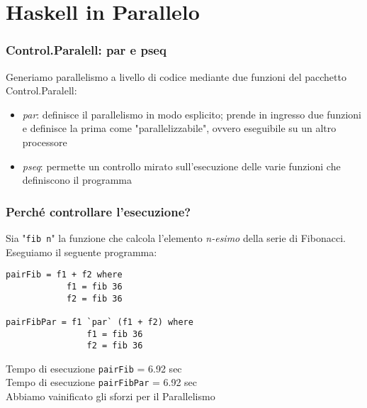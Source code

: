 \documentclass[14pt]{beamer}
\begin{document}

\section{Haskell in Parallelo}




\begin{frame}
\frametitle{Control.Paralell: par e pseq}
Generiamo parallelismo a livello di codice mediante due funzioni del pacchetto Control.Paralell:
\begin{itemize}
\item \textit{par}: definisce il parallelismo in modo esplicito; prende in ingresso due funzioni e definisce la prima come "parallelizzabile", ovvero eseguibile su un altro processore
\item \textit{pseq}: permette un controllo mirato sull'esecuzione delle varie funzioni che definiscono il programma
\end{itemize}
\end{frame}


\begin{frame}[fragile]
\frametitle{Perché controllare l'esecuzione?}
Sia "\texttt{fib n}" la funzione che calcola l'elemento \textit{n-esimo} della serie di Fibonacci. Eseguiamo il seguente programma:
\begin{verbatim}
pairFib = f1 + f2 where
    		f1 = fib 36
    		f2 = fib 36
    
pairFibPar = f1 `par` (f1 + f2) where
    			f1 = fib 36
    			f2 = fib 36
\end{verbatim}
\end{frame}



\begin{frame}
Tempo di esecuzione \texttt{pairFib} = 6.92 sec\\[2ex]
Tempo di esecuzione \texttt{pairFibPar} = 6.92 sec\\[2ex]
Abbiamo vainificato gli sforzi per il Parallelismo\\[2ex]
\end{frame}
\end{document}
